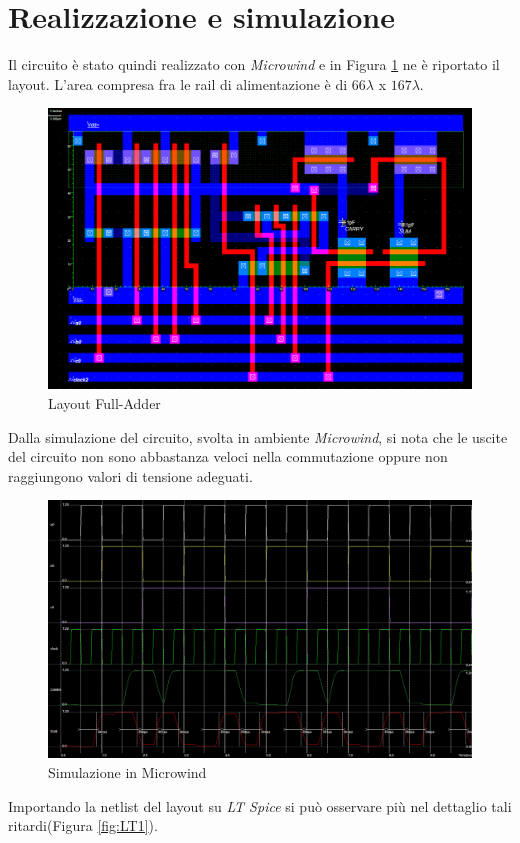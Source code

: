 \documentclass[11pt]{article} %
\begin{document}
\section{Realizzazione e simulazione}

Il circuito è stato quindi realizzato con \emph{Microwind} e in Figura \ref{fig:Layout1} ne è riportato il layout.
L'area compresa fra le rail di alimentazione è di $66\lambda$ x $167 \lambda$.
\begin{figure}[h!]
  \includegraphics[width=\linewidth]{Layout1.png}
  \caption{Layout Full-Adder}
  \label{fig:Layout1}
\end{figure}
\linespread{2}
Dalla simulazione del circuito, svolta in ambiente \emph{Microwind}, si nota che le uscite del circuito non sono abbastanza veloci nella commutazione oppure non raggiungono valori di tensione adeguati.

\begin{figure}[h]
  \includegraphics[width=\linewidth]{Micro1.png}
  \caption{Simulazione in Microwind}
  \label{fig:Micro1}
\end{figure}
Importando la netlist del layout su \emph{LT Spice} si può osservare più nel dettaglio tali ritardi(Figura \ref{fig:LT1}).
\end{document}
